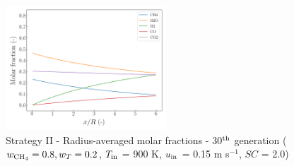 \documentclass[preprint,12pt]{elsarticle}
\begin{document}
\begin{figure}[h!]
\centering
\includegraphics[width=60mm]{results/5Eq/80C_20T/GEN30-AVG.png}
\caption{\label{fig:5RES8020G30-avg} Strategy II - Radius-averaged molar fractions -  30$^{\rm{th}}$ generation ($w_{\rm{CH_4}} = 0.8, w_T = 0.2$, $T_{\rm{in}}$ = 900 K, $u_{\rm{in}}$ = 0.15 m s$^{-1}$, $SC$ = 2.0)}
\end{figure}
\end{document}
